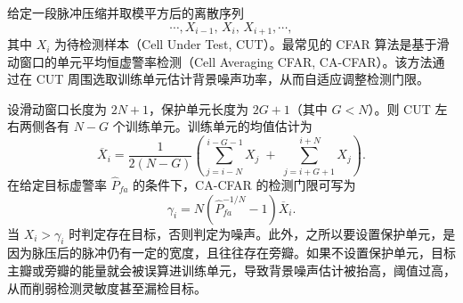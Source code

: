 给定一段脉冲压缩并取模平方后的离散序列
\[
    \cdots, X_{i-1},\, X_i,\, X_{i+1}, \cdots ,
\]
其中 \(X_i\) 为待检测样本（Cell Under Test, CUT）。最常见的 CFAR 算法是基于滑动窗口的单元平均恒虚警率检测（Cell Averaging CFAR, CA-CFAR）。该方法通过在 CUT 周围选取训练单元估计背景噪声功率，从而自适应调整检测门限。

设滑动窗口长度为 \(2N+1\)，保护单元长度为 \(2G+1\)（其中 \(G<N\)）。则 CUT 左右两侧各有 \(N-G\) 个训练单元。训练单元的均值估计为
\[
    \overline{X}_i = \frac{1}{2(N-G)}
    \left( \sum_{j=i-N}^{\,i-G-1} X_j \;+\; \sum_{j=i+G+1}^{\,i+N} X_j \right).
\]
在给定目标虚警率 \(\hat{P}_{fa}\) 的条件下，CA-CFAR 的检测门限可写为
\[
    \gamma_i = N\!\left(\hat{P}_{fa}^{-1/N}-1\right)\overline{X}_i.
\]
当 \(X_i > \gamma_i\) 时判定存在目标，否则判定为噪声。此外，之所以要设置保护单元，是因为脉压后的脉冲仍有一定的宽度，且往往存在旁瓣。如果不设置保护单元，目标主瓣或旁瓣的能量就会被误算进训练单元，导致背景噪声估计被抬高，阈值过高，从而削弱检测灵敏度甚至漏检目标。

